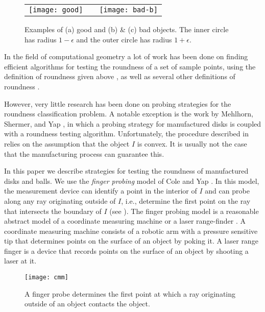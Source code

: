 \documentclass[11pt]{article}
\begin{document}
\begin{figure}
\begin{center}\begin{tabular}{ccc}
\texttt{[image: good]} & \raisebox{-1mm}{\texttt{[image: bad-a]}} &
\texttt{[image: bad-b]}
\end{tabular}\end{center}
\caption{Examples of (a) good and (b) \& (c) bad objects.  
	The inner circle has radius
	$1-\epsilon$ and the outer circle has radius $1+\epsilon$.}
\end{figure}

In the field of computational geometry a lot of work has been done on
finding efficient algorithms for testing the roundness of a set of
sample points, using the definition of roundness given above
\cite{bbbrw98,dgr97,r97}, as well as several other definitions of
roundness
\cite{aas99,aas01,aass99,c00,efnn92,gr98,ks99,ll91,rz92,r99,ssty96,s93}.

However, very little research has been done on probing strategies for
the roundness classification problem.  A notable exception is the work
by \mbox{Mehlhorn}, \mbox{Shermer}, and \mbox{Yap} \cite{msy97,sy95},
in which a probing strategy for manufactured disks is coupled with a
roundness testing algorithm.  Unfortunately, the procedure described
in \cite{msy97,sy95} relies on the assumption that the object $I$ is
convex. It is usually not the case that the manufacturing process can
guarantee this.

In this paper we describe strategies for testing the roundness of
manufactured disks and balls.  We use the \emph{finger probing} model
of \mbox{Cole} and \mbox{Yap} \cite{cy87}.  In this model, the
measurement device can identify a point in the interior of $I$ and can
probe along any ray originating outside of $I$, i.e., determine the
first point on the ray that intersects the boundary of $I$ (see
). The finger probing model is a reasonable abstract model
of a coordinate measuring machine or a laser range-finder \cite{y94}.
A coordinate measuring machine consists of a robotic arm with a
pressure sensitive tip that determines points on the surface of an
object by poking it.  A laser range finger is a device that records
points on the surface of an object by shooting a laser at it.

\begin{figure}
\begin{center}\texttt{[image: cmm]}\end{center}
\caption{A finger probe determines the first point at which a ray
originating outside of an object contacts the object.}
\end{figure}
\end{document}
